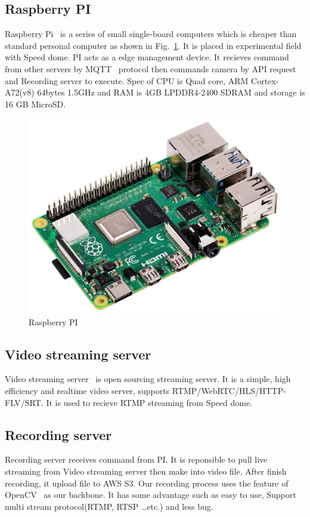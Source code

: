 \subsection{Raspberry PI}
Raspberry Pi~\cite{pi} is a series of small single-board computers which is cheaper than standard personal computer as shown in Fig.~\ref{fig:pi}. It is placed in experimental field with Speed dome. PI acts as a edge management device. It recieves command from other servers by MQTT~\cite{mqtt-intro} protocol then commands camera by API request and Recording server to execute. Spec of CPU is Quad core, ARM Cortex-A72(v8) 64bytes 1.5GHz and RAM is 4GB LPDDR4-2400 SDRAM and storage is 16 GB MicroSD.

\begin{figure}[H]
    \centering
    \includegraphics[width=\textwidth]{figsrc/pi.jpeg}
    \caption{Raspberry PI\label{fig:pi}}
\end{figure}

\subsection{Video streaming server}
Video streaming server~\cite{ossr} is open sourcing streaming server. It is a simple, high efficiency and realtime video server, supports RTMP/WebRTC/HLS/HTTP-FLV/SRT. It is used to recieve RTMP streaming from Speed dome.

\subsection{Recording server}
Recording server receives command from PI. It is reponsible to pull live streaming from Video streaming server then make into video file. After finish recording, it upload file to AWS S3. Our recording process uses the feature of OpenCV~\cite{opencv} as our backbone. It has some advantage such as easy to use, Support multi stream protocol(RTMP, RTSP …etc.) and less bug.

